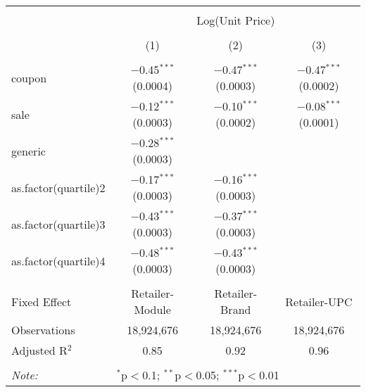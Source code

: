 
\begin{table}[!htbp] \centering 
  \caption{} 
  \label{tab:overallSavingsNonStorable} 
\begin{tabular}{@{\extracolsep{5pt}}lccc} 
\\[-1.8ex]\hline 
\hline \\[-1.8ex] 
 & \multicolumn{3}{c}{Log(Unit Price)} \\ 
\\[-1.8ex] & (1) & (2) & (3)\\ 
\hline \\[-1.8ex] 
 coupon & $-$0.45$^{***}$ (0.0004) & $-$0.47$^{***}$ (0.0003) & $-$0.47$^{***}$ (0.0002) \\ 
  sale & $-$0.12$^{***}$ (0.0003) & $-$0.10$^{***}$ (0.0002) & $-$0.08$^{***}$ (0.0001) \\ 
  generic & $-$0.28$^{***}$ (0.0003) &  &  \\ 
  as.factor(quartile)2 & $-$0.17$^{***}$ (0.0003) & $-$0.16$^{***}$ (0.0003) &  \\ 
  as.factor(quartile)3 & $-$0.43$^{***}$ (0.0003) & $-$0.37$^{***}$ (0.0003) &  \\ 
  as.factor(quartile)4 & $-$0.48$^{***}$ (0.0003) & $-$0.43$^{***}$ (0.0003) &  \\ 
 \hline \\[-1.8ex] 
Fixed Effect & Retailer-Module & Retailer-Brand & Retailer-UPC \\ 
Observations & 18,924,676 & 18,924,676 & 18,924,676 \\ 
Adjusted R$^{2}$ & 0.85 & 0.92 & 0.96 \\ 
\hline 
\hline \\[-1.8ex] 
\textit{Note:}  & \multicolumn{3}{l}{$^{*}$p$<$0.1; $^{**}$p$<$0.05; $^{***}$p$<$0.01} \\ 
\end{tabular} 
\end{table} 
